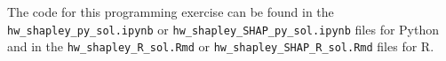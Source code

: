 \documentclass[a4paper]{article}
\begin{document}

The code for this programming exercise can be found in the \texttt{hw\_shapley\_py\_sol.ipynb} or \texttt{hw\_shapley\_SHAP\_py\_sol.ipynb} files for Python and in the \texttt{hw\_shapley\_R\_sol.Rmd} or \texttt{hw\_shapley\_SHAP\_R\_sol.Rmd} files for R.




%
\end{document}
